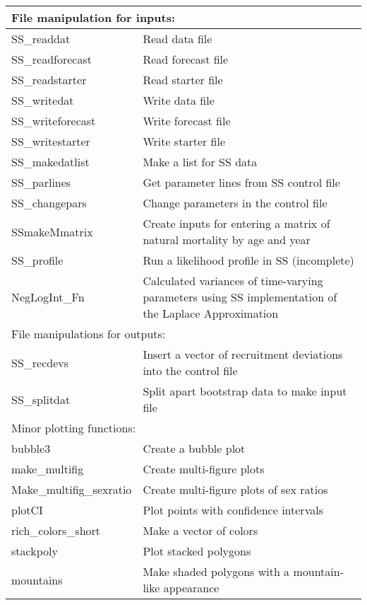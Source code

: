\begin{center}
\begin{longtable}{p{4.5cm} p{10.52cm}}
		\multicolumn{2}{l}{File manipulation for inputs:}\Tstrut\Bstrut\\
		\hline
		SS\_readdat  \Tstrut & Read data file \\
		SS\_readforecast \Tstrut & Read forecast file \\
		SS\_readstarter  \Tstrut & Read starter file \\
		SS\_writedat  \Tstrut & Write data file \\
		SS\_writeforecast \Tstrut & Write forecast file \\
		SS\_writestarter  \Tstrut & Write starter file \\\Tstrut 
		SS\_makedatlist   \Tstrut & Make a list for SS data \\
		SS\_parlines    \Tstrut & Get parameter lines from SS control file \\
		SS\_changepars  \Tstrut  & Change parameters in the control file \\
		SSmakeMmatrix    \Tstrut & Create inputs for entering a matrix of natural mortality by age and year \\
		SS\_profile      \Tstrut & Run a likelihood profile in SS (incomplete) \\
		NegLogInt\_Fn     \Tstrut& Calculated variances of time-varying parameters using SS implementation of the Laplace Approximation \Bstrut\\
		\hline

		\multicolumn{2}{l}{File manipulations for outputs:}\Tstrut\Bstrut\\
		\hline
		SS\_recdevs  \Tstrut & Insert a vector of recruitment deviations into the control file \\
		SS\_splitdat \Tstrut & Split apart bootstrap data to make input file \Bstrut\\
		\hline

		\multicolumn{2}{l}{Minor plotting functions:}\Tstrut\Bstrut\\
		\hline
		bubble3         \Tstrut & Create a bubble plot \\
		make\_multifig  \Tstrut & Create multi-figure plots \\
		Make\_multifig\_sexratio \Tstrut & Create multi-figure plots of sex ratios \\
		plotCI          \Tstrut & Plot points with confidence intervals \\
		rich\_colors\_short \Tstrut & Make a vector of colors \\
		stackpoly       \Tstrut & Plot stacked polygons \\
		mountains       \Tstrut & Make shaded polygons with a mountain-like appearance \Bstrut\\
		

\end{longtable}
\end{center}
